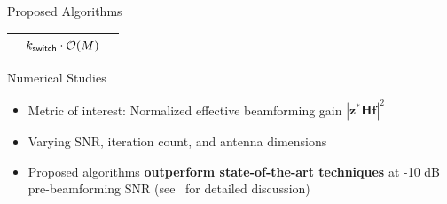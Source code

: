\documentclass[pdf]{beamer}
\begin{document}
\begin{frame}[t]
\begin{textblock}{0.98}
\begin{tcbraster}[%
    raster columns = 2,
    raster column skip = 0.01\paperwidth,
    raster row skip = 0.01\paperwidth,
    raster equal height=rows
    ]
\begin{mybox}[%
    sidebyside=false,
    left=4pt,
    right=4pt,
    ]{Proposed Algorithms}
\begin{center}
{\begin{tabular}{|c|c|c|}
    & {\color{Blue}$k_{\mathsf{switch}} \cdot {\cal O}(M)$} \\\hline
    \end{tabular}}
      \end{center}
  \end{mybox}
  \begin{mybox}[sidebyside=false]{Numerical Studies}
      \begin{tcbraster}[%
        raster columns=2,
        raster valign=center,
        ]
        \begin{tcolorbox}[blankest]
          \small
          \addtolength{\leftmargini}{\labelsep}
          \begin{itemize}
          \item Metric of interest: Normalized effective beamforming gain $|\mathbf{z}^* \mathbf{H} \mathbf{f}|^2$
          \item Varying SNR, iteration count, and antenna dimensions
          \item Proposed algorithms \textbf{outperform state-of-the-art techniques} at -10 dB pre-beamforming SNR (see~\cite{journal_paper} for detailed discussion)
          \end{itemize}
        \end{tcolorbox}
        \begin{tcolorbox}[blankest]
          \resizebox{\textwidth}{!}{}
        \end{tcolorbox}

        \begin{tcolorbox}[blankest]
          \resizebox{\textwidth}{!}{}
        \end{tcolorbox}
        \begin{tcolorbox}[blankest]
          \resizebox{\textwidth}{!}{}
        \end{tcolorbox}


\end{tcbraster}
\end{mybox}
\end{tcbraster}
\end{textblock}
\end{frame}
\end{document}
